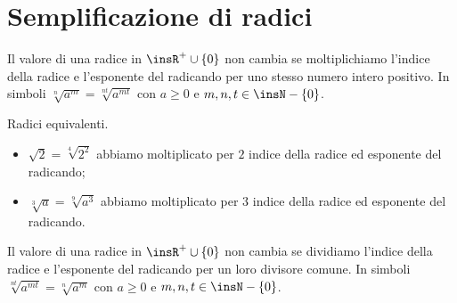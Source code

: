 
\section{Semplificazione di radici}
\label{sec:radici_semplificazione}

\begin{proposizione}
Il valore di una radice in $\insR^+\cup \{0\}$ non cambia se moltiplichiamo 
l'indice della radice e l'esponente del radicando per uno stesso numero intero 
positivo. In simboli $\sqrt[n]{a^m}=\sqrt[\mathit{nt}]{a^{\mathit{mt}}}$ 
con $a\ge 0$ e $m,n,t\in \insN-\{0\}$.
\end{proposizione}
\begin{exrig}
 \begin{esempio}
 Radici equivalenti.
 \begin{itemize}
 \item $\sqrt 2=\sqrt[4]{2^2}$ abbiamo moltiplicato per $2$ indice della 
  radice ed esponente del radicando;
 \item $\sqrt[3]a=\sqrt[9]{a^3}$ abbiamo moltiplicato per $3$ indice della 
  radice ed esponente del radicando.
\end{itemize}
 \end{esempio}
\end{exrig}

\begin{proposizione}
Il valore di una radice in $\insR^+\cup \{0\}$ non cambia se dividiamo 
l'indice della radice e l'esponente del radicando per un loro divisore comune. 
In simboli $\sqrt[nt]{a^{mt}}=\sqrt[n]{a^m}$ con $a\ge 0$ e 
$m,n,t\in \insN-\{0\}$.
\end{proposizione}

